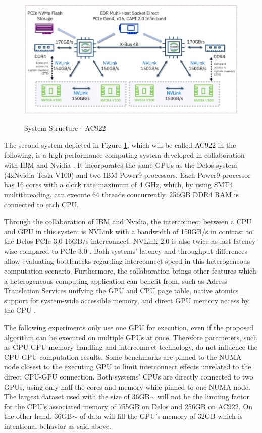 \begin{figure}[H]
  \caption{System Structure - AC922 \cite{ganesannarayanasamyPowerAIDeepDive}}
  \includegraphics[width=\textwidth]{figures/ac922_system_arch.png}
  \centering
  \label{fig:ac922_arch}
\end{figure}

The second system depicted in Figure \ref{fig:ac922_arch}, which will be called AC922 in the following, is a high-performance computing system developed in collaboration with IBM and Nvidia \cite{caldeiraIBMPowerSystem}. It incorporates the same GPUs as the Delos system (4xNvidia Tesla V100) and two IBM Power9 processors. Each Power9 processor has 16 cores with a clock rate maximum of 4 GHz, which, by using SMT4 multithreading, can execute 64 threads concurrently. 256GB DDR4 RAM is connected to each CPU.

Through the collaboration of IBM and Nvidia, the interconnect between a CPU and GPU in this system is NVLink \cite{NVLink2021, zargesEvaluationOnNodeGPU} with a bandwidth of 150GB/s in contrast to the Delos PCIe 3.0 16GB/s interconnect. NVLink 2.0 is also twice as fast latency-wise compared to PCIe 3.0 \cite{liEvaluatingModernGPU2020}. Both systems' latency and throughput differences allow evaluating bottlenecks regarding interconnect speed in this heterogeneous computation scenario.
Furthermore, the collaboration brings other features which a heterogeneous computing application can benefit from, such as Adress Translation Services \cite{ibmpower9nputeamFunctionalityPerformanceNVLink2018} unifying the GPU and CPU page table, native atomics support for system-wide accessible memory, and direct GPU memory access by the CPU \cite{UNIFIEDMEMORYP9}.

The following experiments only use one GPU for execution, even if the proposed algorithm can be executed on multiple GPUs at once. Therefore parameters, such as GPU-GPU memory handling and interconnect technology, do not influence the CPU-GPU computation results. Some benchmarks are pinned to the NUMA node closest to the executing GPU to limit interconnect effects unrelated to the direct CPU-GPU connection. Both systems' CPUs are directly connected to two GPUs, using only half the cores and memory while pinned to one NUMA node. The largest dataset used with the size of 36GB$\sim$ will not be the limiting factor for the CPU's associated memory of 755GB on Delos and 256GB on AC922. On the other hand, 36GB$\sim$ of data will fill the GPU's memory of 32GB which is intentional behavior as said above.


